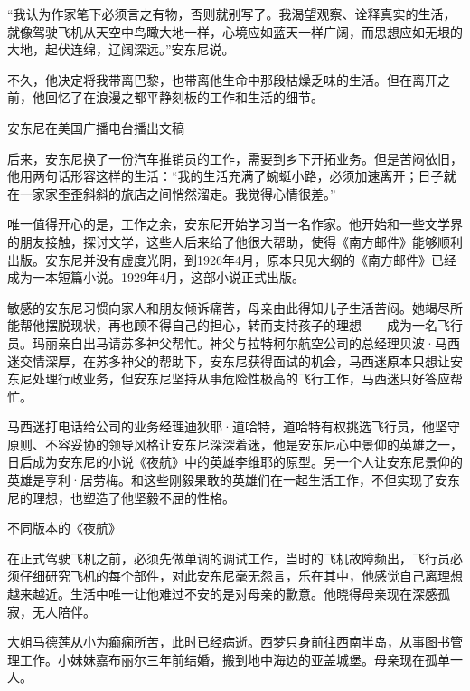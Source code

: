 “我认为作家笔下必须言之有物，否则就别写了。我渴望观察、诠释真实的生活，就像驾驶飞机从天空中鸟瞰大地一样，心境应如蓝天一样广阔，而思想应如无垠的大地，起伏连绵，辽阔深远。”安东尼说。

不久，他决定将我带离巴黎，也带离他生命中那段枯燥乏味的生活。但在离开之前，他回忆了在浪漫之都平静刻板的工作和生活的细节。

{\startalignment[center]
 \stopalignment}
安东尼在美国广播电台播出文稿

后来，安东尼换了一份汽车推销员的工作，需要到乡下开拓业务。但是苦闷依旧，他用两句话形容这样的生活：“我的生活充满了蜿蜒小路，必须加速离开；日子就在一家家歪歪斜斜的旅店之间悄然溜走。我觉得心情很差。”

唯一值得开心的是，工作之余，安东尼开始学习当一名作家。他开始和一些文学界的朋友接触，探讨文学，这些人后来给了他很大帮助，使得《南方邮件》能够顺利出版。安东尼并没有虚度光阴，到1926年4月，原本只见大纲的《南方邮件》已经成为一本短篇小说。1929年4月，这部小说正式出版。

敏感的安东尼习惯向家人和朋友倾诉痛苦，母亲由此得知儿子生活苦闷。她竭尽所能帮他摆脱现状，再也顾不得自己的担心，转而支持孩子的理想------成为一名飞行员。玛丽亲自出马请苏多神父帮忙。神父与拉特柯尔航空公司的总经理贝波·马西迷交情深厚，在苏多神父的帮助下，安东尼获得面试的机会，马西迷原本只想让安东尼处理行政业务，但安东尼坚持从事危险性极高的飞行工作，马西迷只好答应帮忙。

马西迷打电话给公司的业务经理迪狄耶·道哈特，道哈特有权挑选飞行员，他坚守原则、不容妥协的领导风格让安东尼深深着迷，他是安东尼心中景仰的英雄之一，日后成为安东尼的小说《夜航》中的英雄李维耶的原型。另一个人让安东尼景仰的英雄是亨利·居劳梅。和这些刚毅果敢的英雄们在一起生活工作，不但实现了安东尼的理想，也塑造了他坚毅不屈的性格。

{\startalignment[center]
 \stopalignment}
不同版本的《夜航》

在正式驾驶飞机之前，必须先做单调的调试工作，当时的飞机故障频出，飞行员必须仔细研究飞机的每个部件，对此安东尼毫无怨言，乐在其中，他感觉自己离理想越来越近。生活中唯一让他难过不安的是对母亲的歉意。他晓得母亲现在深感孤寂，无人陪伴。

大姐马德莲从小为癫痫所苦，此时已经病逝。西梦只身前往西南半岛，从事图书管理工作。小妹妹嘉布丽尔三年前结婚，搬到地中海边的亚盖城堡。母亲现在孤单一人。

